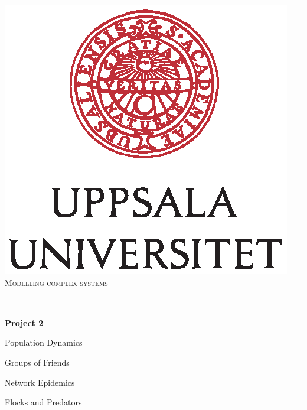 \documentclass[12pt]{article}
\begin{document}
\begin{titlepage}

\newcommand{\HRule}{\rule{\linewidth}{0.5mm}} %

\center %
 

\includegraphics{UU_logo.eps}\\[0.5cm] %
 
\textsc{\Large Modelling complex systems}\\[0.5cm] %



\HRule \\[0.4cm]
{\huge \bfseries Project 2}\\[0.2cm] %
{\Large Population Dynamics \par Groups of Friends \par Network Epidemics \par Flocks and Predators }
\\


\end{titlepage}
\end{document}
